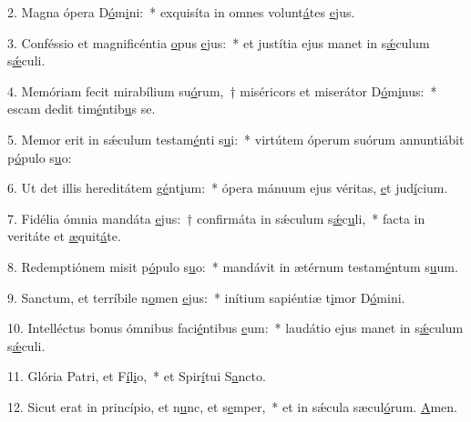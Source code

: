 2. Magna ópera D\uline{ó}m\uline{i}ni:~* exquisíta in omnes volunt\uline{á}tes \uline{e}jus.\par 
3. Conféssio et magnificéntia \uline{o}pus \uline{e}jus:~* et justítia ejus manet in s\uline{ǽ}culum s\uline{ǽ}culi.\par 
4. Memóriam fecit mirabílium su\uline{ó}rum,~† miséricors et miserátor D\uline{ó}m\uline{i}nus:~* escam dedit tim\uline{é}ntib\uline{u}s se.\par 
5. Memor erit in sǽculum testam\uline{é}nti s\uline{u}i:~* virtútem óperum suórum annuntiábit p\uline{ó}pulo s\uline{u}o:\par 
6. Ut det illis hereditátem g\uline{é}nt\uline{i}um:~* ópera mánuum ejus véritas, \uline{e}t jud\uline{í}cium.\par 
7. Fidélia ómnia mandáta \uline{e}jus:~† confirmáta in sǽculum s\uline{ǽ}c\uline{u}li,~* facta in veritáte et \uline{æ}quit\uline{á}te.\par 
8. Redemptiónem misit p\uline{ó}pulo s\uline{u}o:~* mandávit in ætérnum testam\uline{é}ntum s\uline{u}um.\par 
9. Sanctum, et terríbile n\uline{o}men \uline{e}jus:~* inítium sapiéntiæ t\uline{i}mor D\uline{ó}mini.\par 
10. Intelléctus bonus ómnibus faci\uline{é}ntibus \uline{e}um:~* laudátio ejus manet in s\uline{ǽ}culum s\uline{ǽ}culi.\par 
11. Glória Patri, et F\uline{í}l\uline{i}o,~* et Spir\uline{í}tui S\uline{a}ncto.\par 
12. Sicut erat in princípio, et n\uline{u}nc, et s\uline{e}mper,~* et in sǽcula sæcul\uline{ó}rum. \uline{A}men.\par 
